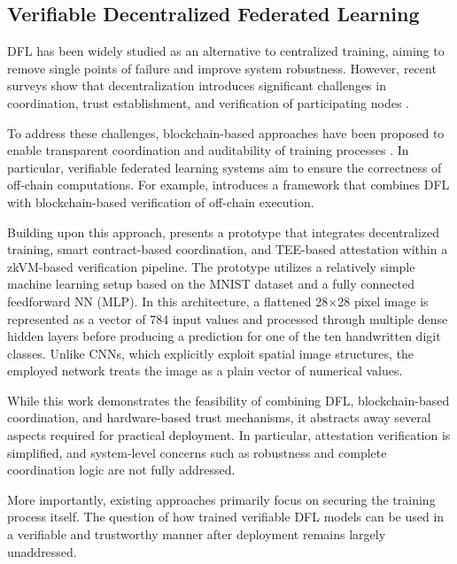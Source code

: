 \subsection{Verifiable Decentralized Federated Learning}

\ac{DFL} has been widely studied as an alternative to centralized training, aiming to remove single points of failure and improve system robustness. However, recent surveys show that decentralization introduces significant challenges in coordination, trust establishment, and verification of participating nodes \cite{martinezbeltran2023decentralized}.

To address these challenges, blockchain-based approaches have been proposed to enable transparent coordination and auditability of training processes \cite{qu2023blockchainfl}. In particular, verifiable federated learning systems aim to ensure the correctness of off-chain computations. For example, \cite{heiss2022verifiable, 10634412} introduces a framework that combines \ac{DFL} with blockchain-based verification of off-chain execution.


Building upon this approach, \cite{hartmann2024dfl} presents a prototype that integrates decentralized training, smart contract-based coordination, and \ac{TEE}-based attestation within a \ac{zkVM}-based verification pipeline. The prototype utilizes a relatively simple machine learning setup based on the MNIST dataset and a fully connected feedforward \ac{NN} (\ac{MLP}). In this architecture, a flattened 28$\times$28 pixel image is represented as a vector of 784 input values and processed through multiple dense hidden layers before producing a prediction for one of the ten handwritten digit classes. Unlike \acp{CNN}, which explicitly exploit spatial image structures, the employed network treats the image as a plain vector of numerical values.

While this work demonstrates the feasibility of combining \ac{DFL}, blockchain-based coordination, and hardware-based trust mechanisms, it abstracts away several aspects required for practical deployment. In particular, attestation verification is simplified, and system-level concerns such as robustness and complete coordination logic are not fully addressed.

More importantly, existing approaches primarily focus on securing the training process itself. The question of how trained verifiable \ac{DFL} models can be used in a verifiable and trustworthy manner after deployment remains largely unaddressed.

